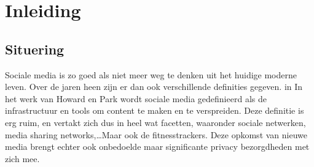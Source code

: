 
\chapter{Inleiding}

\section{Situering}
Sociale media is zo goed als niet meer weg te denken uit het huidige moderne
leven. Over de jaren heen zijn er dan ook verschillende definities gegeven. in
In het werk van Howard en Park wordt sociale media gedefinieerd als de
infrastructuur en tools om content te maken en te
verspreiden\cite{PhilipsAndParks}. Deze definitie is erg ruim, en vertakt zich
dus in heel wat facetten, waaronder sociale netwerken, media sharing
networks,\ldots Maar ook de fitnesstrackers. Deze opkomst van nieuwe media
brengt echter ook onbedoelde maar significante privacy bezorgdheden met zich
mee.

